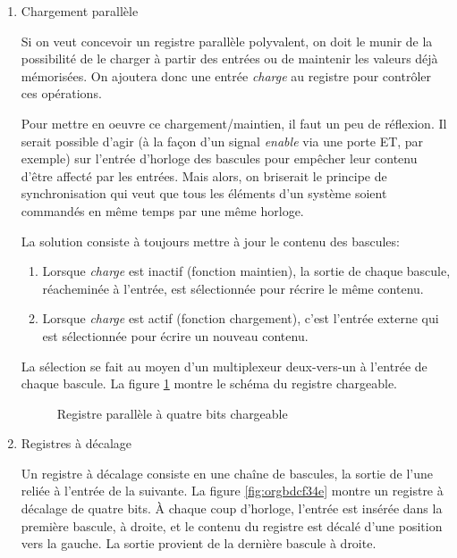 \documentclass[letter, oneside]{book}
\begin{document}
\begin{enumerate}
\item Chargement parallèle
\label{sec:org47192f0}

Si on veut concevoir un registre parallèle polyvalent, on doit le
munir de la possibilité de le charger à partir des entrées ou de
maintenir les valeurs déjà mémorisées. On ajoutera donc une entrée
\emph{charge} au registre pour contrôler ces opérations.

Pour mettre en oeuvre ce chargement/maintien, il faut un peu de
réflexion. Il serait possible d'agir (à la façon d'un signal \emph{enable}
via une porte ET, par exemple) sur l'entrée d'horloge des bascules pour
empêcher leur contenu d'être affecté par les entrées. Mais alors, on
briserait le principe de synchronisation qui veut que tous les
éléments d'un système soient commandés en même temps par une même
horloge.

La solution consiste à toujours mettre à jour le contenu des bascules: 

\begin{enumerate}
\item Lorsque \emph{charge} est inactif (fonction maintien), la sortie de
chaque bascule, réacheminée à l'entrée, est sélectionnée pour
récrire le même contenu.
\item Lorsque \emph{charge} est actif (fonction chargement), c'est l'entrée
externe qui est sélectionnée pour écrire un nouveau contenu.
\end{enumerate}

La sélection se fait au moyen d'un multiplexeur deux-vers-un à
l'entrée de chaque bascule. La figure \ref{fig:org3288bc5} montre le schéma
du registre chargeable.

\begin{figure}[htbp]
\centering

\caption{\label{fig:org3288bc5}Registre parallèle à quatre bits chargeable}
\end{figure}

\item Registres à décalage
\label{sec:org8141ece}

Un registre à décalage consiste en une chaîne de bascules, la sortie
de l'une reliée à l'entrée de la suivante. La figure \ref{fig:orgbdcf34e} montre
un registre à décalage de quatre bits. À chaque coup d'horloge,
l'entrée est insérée dans la première bascule, à droite, et le contenu
du registre est décalé d'une position vers la gauche. La sortie
provient de la dernière bascule à droite.


\end{enumerate}
\end{document}
